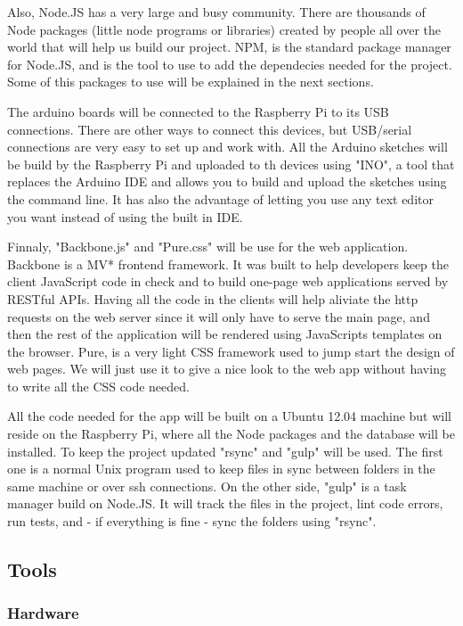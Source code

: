 \documentclass[a4paper]{article}
\begin{document}
Also, Node.JS has a very large and busy community. There are thousands of Node packages (little node programs or libraries) created by people all over the world that will help us build our project. NPM, is the standard package manager for Node.JS, and is the tool to use to  add the dependecies needed for the project. Some of this packages to use will be explained in the next sections.

The arduino boards will be connected to the Raspberry Pi to its USB connections. There are other ways to connect this devices, but USB/serial connections are very easy to set up and work with. All the Arduino sketches will be build by the Raspberry Pi and uploaded to th devices using "INO", a tool that replaces the Arduino IDE and allows you to build and upload the sketches using the command line. It has also the advantage of letting you use any text editor you want instead of using the built in IDE.

Finnaly, "Backbone.js" and "Pure.css" will be use for the web application. Backbone is a MV* frontend framework. It was built to help developers keep the client JavaScript code in check and to build one-page web applications served by RESTful APIs. Having all the code in the clients will help aliviate the http requests on the web server since it will only have to serve the main page, and then the rest of the application will be rendered using JavaScripts templates on the browser. Pure, is a very light CSS framework used to jump start the design of web pages. We will just use it to give a nice look to the web app without having to write all the CSS code needed.

All the code needed for the app will be built on a Ubuntu 12.04 machine but will reside on the Raspberry Pi, where all the Node packages and the database will be installed. To keep the project updated "rsync" and "gulp" will be used. The first one is a normal Unix program used to keep files in sync between folders in the same machine or over ssh connections. On the other side, "gulp" is a task manager build on Node.JS. It will track the files in the project, lint code errors, run tests, and - if everything is fine - sync the folders using "rsync".

\subsection{Tools}

\subsubsection{Hardware}
\end{document}
